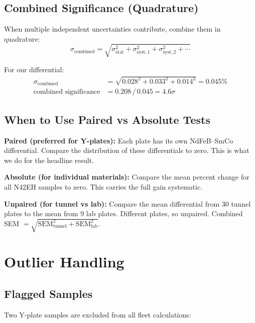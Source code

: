 \documentclass[11pt,letterpaper]{article}
\begin{document}
\subsection{Combined Significance (Quadrature)}

When multiple independent uncertainties contribute, combine them in quadrature:
\begin{equation*}
\sigma_{\mathrm{combined}} = \sqrt{\sigma_{\mathrm{stat}}^2 + \sigma_{\mathrm{syst,1}}^2 + \sigma_{\mathrm{syst,2}}^2 + \cdots}
\end{equation*}

For our differential:
\begin{align*}
\sigma_{\mathrm{combined}} &= \sqrt{0.028^2 + 0.033^2 + 0.014^2} = 0.045\% \\
\text{combined significance} &= 0.208\,/\,0.045 = 4.6\sigma
\end{align*}

\subsection{When to Use Paired vs Absolute Tests}

\textbf{Paired (preferred for Y-plates):} Each plate has its own NdFeB--SmCo
differential. Compare the distribution of these differentials to zero. This is
what we do for the headline result.

\textbf{Absolute (for individual materials):} Compare the mean percent change
for all N42EH samples to zero. This carries the full gain systematic.

\textbf{Unpaired (for tunnel vs lab):} Compare the mean differential from 30
tunnel plates to the mean from 9 lab plates. Different plates, so unpaired.
Combined SEM $= \sqrt{\mathrm{SEM}_{\mathrm{tunnel}}^2 + \mathrm{SEM}_{\mathrm{lab}}^2}$.


\section{Outlier Handling}
\label{sec:outliers}

\subsection{Flagged Samples}

Two Y-plate samples are excluded from all fleet calculations:
\end{document}
